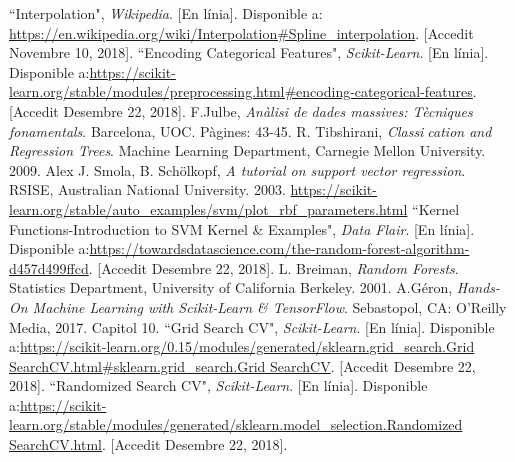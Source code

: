 \documentclass[10pt,a4paper,twocolumn,twoside]{article}
\begin{document}
\begin{thebibliography}{11}
 ``Interpolation", \textit{Wikipedia}. [En línia]. Disponible a: \url{https://en.wikipedia.org/wiki/Interpolation#Spline_interpolation}. [Accedit Novembre 10, 2018].
``Encoding Categorical Features", \textit{Scikit-Learn}. [En línia]. Disponible a:\url{https://scikit-learn.org/stable/modules/preprocessing.html#encoding-categorical-features}. [Accedit Desembre 22, 2018].
F.Julbe, \textit{Anàlisi de dades massives: Tècniques fonamentals}. Barcelona, UOC. Pàgines: 43-45.
R. Tibshirani, \textit{Classication and Regression Trees}. Machine Learning Department, Carnegie Mellon University. 2009.
Alex J. Smola, B. Schölkopf, \textit{A tutorial on support vector regression}. RSISE, Australian National University. 2003.
\url{https://scikit-learn.org/stable/auto_examples/svm/plot_rbf_parameters.html}
``Kernel Functions-Introduction to SVM Kernel \& Examples", \textit{Data Flair}. [En línia]. Disponible a:\url{https://towardsdatascience.com/the-random-forest-algorithm-d457d499ffcd}. [Accedit Desembre 22, 2018].
L. Breiman, \textit{Random Forests}. Statistics Department, University of California Berkeley. 2001.
A.Géron, \textit{Hands-On Machine Learning with Scikit-Learn \& TensorFlow}. Sebastopol, CA: O’Reilly Media, 2017. Capitol 10.
``Grid Search CV", \textit{Scikit-Learn}. [En línia]. Disponible a:\url{https://scikit-learn.org/0.15/modules/generated/sklearn.grid_search.Grid SearchCV.html#sklearn.grid_search.Grid SearchCV}. [Accedit Desembre 22, 2018].
``Randomized Search CV", \textit{Scikit-Learn}. [En línia]. Disponible a:\url{https://scikit-learn.org/stable/modules/generated/sklearn.model_selection.Randomized SearchCV.html}. [Accedit Desembre 22, 2018].

\end{thebibliography}
\clearpage
\end{document}
